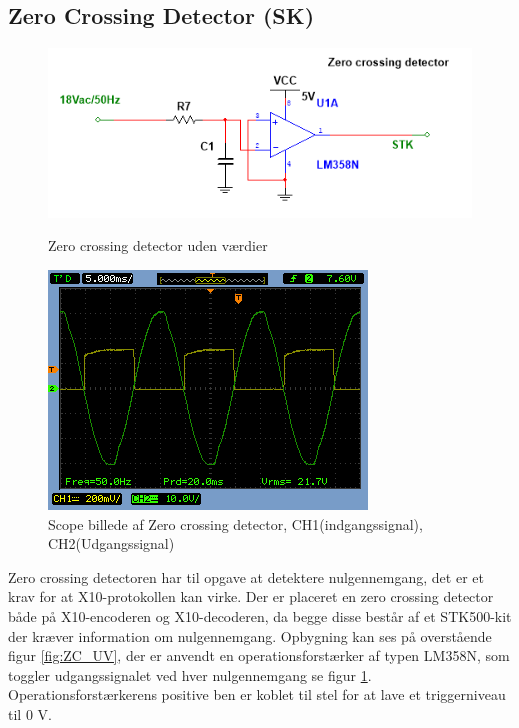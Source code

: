 \subsection{Zero Crossing Detector (SK)}
\begin{figure}[htb]
  \begin{minipage}{0.45\textwidth}
    \centering
      \includegraphics[width=\textwidth]{billeder/HWdesign/ZC_UV}
      \caption{Zero crossing detector uden værdier}
    \label{fig:ZC_UV}
  \end{minipage}
  \hspace{0.1\textwidth}
  \begin{minipage}{0.45\textwidth}
    \centering
      \includegraphics[width=\textwidth]{billeder/HWTest/Encoder/Encoder_zerocross}
      \caption{Scope billede af Zero crossing detector, CH1(indgangssignal), CH2(Udgangssignal)}
    \label{fig:Encoder_Zerocross}
  \end{minipage}
\end{figure}

Zero crossing detectoren har til opgave at detektere nulgennemgang, det er et krav for at X10-protokollen kan virke. Der er placeret en zero crossing detector både på X10-encoderen og X10-decoderen, da begge disse består af et STK500-kit der kræver information om nulgennemgang. Opbygning kan ses på overstående figur \ref{fig:ZC_UV}, der er anvendt en operationsforstærker af typen LM358N, som toggler udgangssignalet ved hver nulgennemgang se figur \ref{fig:Encoder_Zerocross}. Operationsforstærkerens positive ben er koblet til stel for at lave et triggerniveau til 0 V.

